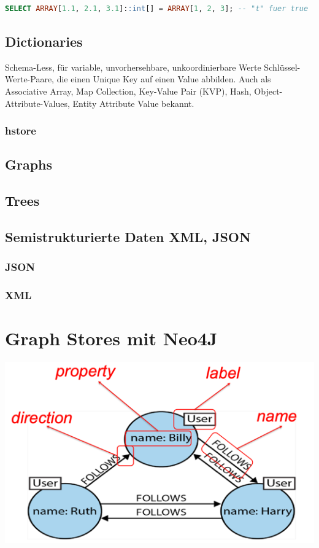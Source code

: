 \documentclass[a4paper, landscape, 8pt]{scrartcl}
\begin{document}
\begin{multicols*}{4}
        \begin{lstlisting}[language=sql]
            SELECT ARRAY[1.1, 2.1, 3.1]::int[] = ARRAY[1, 2, 3]; -- "t" fuer true
        \end{lstlisting}

        \subsection{Dictionaries}
        Schema-Less, für variable, unvorhersehbare, unkoordinierbare Werte
        Schlüssel-Werte-Paare, die einen Unique Key auf einen Value abbilden.
        Auch als Associative Array, Map Collection, Key-Value Pair (KVP), Hash, Object-Attribute-Values, Entity Attribute Value bekannt.

        \subsubsection{hstore}

        \subsection{Graphs}
        \subsection{Trees}
        
        \subsection{Semistrukturierte Daten {\tiny XML, JSON}}
        \subsubsection{JSON}

        \subsubsection{XML}


        \section{Graph Stores {\tiny mit Neo4J}}
        \includegraphics[width=0.5\columnwidth]{graphic/12-example-graph-store}


\end{multicols*}
\end{document}
